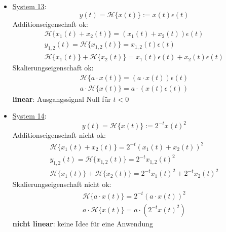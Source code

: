 \documentclass[11pt,a4paper,DIV=12]{scrartcl}
\numberwithin{equation}{section}
\numberwithin{figure}{section}
\newcommand{\sysH}[1]{\mathcal{H}{\{#1\}}}
\begin{document}
\begin{Loesung}
\begin{itemize}
\item  \underline{System 13}:
\begin{equation}
y(t) = \sysH{x(t)}:= x(t) \epsilon(t)
\end{equation}
Additionseigenschaft ok:
\begin{align}
\sysH{x_1(t)+x_2(t)}= (x_1(t) + x_2(t)) \epsilon(t)\\
y_{1,2}(t) = \sysH{x_{1,2}(t)}= x_{1,2}(t)\epsilon(t)\\
\sysH{x_1(t)} + \sysH{x_2(t)} = x_1(t) \epsilon(t) + x_2(t) \epsilon(t)
\end{align}
Skalierungseigenschaft ok:
\begin{align}
\sysH{a \cdot x(t)}= (a \cdot x(t)) \epsilon(t)\\
a \cdot \sysH{x(t)}= a \cdot (x(t)\epsilon(t))
\end{align}
\textbf{linear}: Ausgangssignal Null für $t<0$

\item  \underline{System 14}:
\begin{equation}
y(t) = \sysH{x(t)}:= 2^{-t} x(t)^2
\end{equation}
Additionseigenschaft nicht ok:
\begin{align}
\sysH{x_1(t)+x_2(t)}=  2^{-t} (x_1(t)+x_2(t))^2 \\
y_{1,2}(t) = \sysH{x_{1,2}(t)}=  2^{-t} x_{1,2}(t)^2\\
\sysH{x_1(t)} + \sysH{x_2(t)} = 2^{-t} x_{1}(t)^2 + 2^{-t} x_{2}(t)^2
\end{align}
Skalierungseigenschaft nicht ok:
\begin{align}
\sysH{a \cdot x(t)}= 2^{-t} (a \cdot x(t))^2\\
a \cdot \sysH{x(t)}= a \cdot (2^{-t} x(t)^2)
\end{align}
\textbf{nicht linear}: keine Idee für eine Anwendung

\end{itemize}
\end{Loesung}
\end{document}
